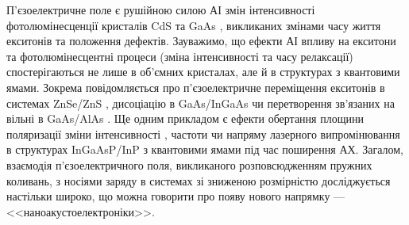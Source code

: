 П'єзоелектричне поле є  рушійною силою АІ змін інтенсивності фотолюмінесценції кристалів CdS \cite{KOROTCHENKOV1998,KorotchenAPL1998} та GaAs \cite{Zhuravlev}, викликаних змінами часу життя екситонів та положення дефектів.
Зауважимо, що ефекти АІ впливу на екситони та фотолюмінесцентні процеси (зміна інтенсивності та часу релаксації) спостерігаються не лише в об'ємних кристалах, але й в структурах з квантовими ямами.
Зокрема повідомляється про п'єзоелектричне переміщення екситонів в системах ZnSe/ZnS \cite{KorotAPL1999,Ostrovskii2001},
дисоціацію в GaAs/InGaAs \cite{PhysRevLett78} чи перетворення зв'язаних на вільні в GaAs/AlAs \cite{PhysRevB80:165307}.
Ще одним прикладом є ефекти
обертання площини поляризації \cite{Kulakova:2012SSC,KulakFTP2013}
зміни інтенсивності \cite{Kulakova:09,KulacFTT2009,KulakJETF2007}, частоти \cite{KulakPJETF} чи напряму \cite{KulakPJTF2010} лазерного випромінювання в структурах InGaAsP/InP з квантовими ямами під час поширення АХ.
Загалом, взаємодія п'єзоелектричного поля, викликаного розповсюдженням  пружних коливань, з носіями заряду в системах зі зниженою розмірністю досліджується настільки широко, що можна говорити про появу нового напрямку --- <<наноакустоелектроніки>>.





